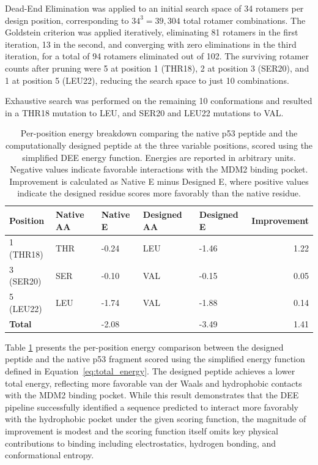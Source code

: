 Dead-End Elimination was applied to an initial search space of 34 rotamers per design position, corresponding to $34^3=39,304$ total rotamer combinations. The Goldstein criterion was applied iteratively, eliminating 81 rotamers in the first iteration, 13 in the second, and converging with zero eliminations in the third iteration, for a total of 94 rotamers eliminated out of 102. The surviving rotamer counts after pruning were 5 at position 1 (THR18), 2 at position 3 (SER20), and 1 at position 5 (LEU22), reducing the search space to just 10 combinations.

Exhaustive search was performed on the remaining 10 conformations and resulted in a THR18 mutation to LEU, and SER20 and LEU22 mutations to VAL.

\begin{table}[h]
\centering
\caption{Per-position energy breakdown comparing the native p53 peptide and the computationally designed peptide at the three variable positions, scored using the simplified DEE energy function. Energies are reported in arbitrary units. Negative values indicate favorable interactions with the MDM2 binding pocket. Improvement is calculated as Native E minus Designed E, where positive values indicate the designed residue scores more favorably than the native residue.}
\begin{tabular}{lllllr}
\hline
\textbf{Position} & \textbf{Native AA} & \textbf{Native E} & \textbf{Designed AA} & \textbf{Designed E} & \textbf{Improvement} \\
\hline
1 (THR18) & THR & -0.24 & LEU & -1.46 & 1.22 \\
3 (SER20) & SER & -0.10 & VAL & -0.15 & 0.05 \\
5 (LEU22) & LEU & -1.74 & VAL & -1.88 & 0.14 \\
\hline
\textbf{Total} & & -2.08 & & -3.49 & 1.41 \\
\hline
\end{tabular}
\label{tab:dee_comparison}
\end{table}

Table \ref{tab:dee_comparison} presents the per-position energy comparison between the designed peptide and the native p53 fragment scored using the simplified energy function defined in Equation~\ref{eq:total_energy}. The designed peptide achieves a lower total energy, reflecting more favorable van der Waals and hydrophobic contacts with the MDM2 binding pocket. While this result demonstrates that the DEE pipeline successfully identified a sequence predicted to interact more favorably with the hydrophobic pocket under the given scoring function, the magnitude of improvement is modest and the scoring function itself omits key physical contributions to binding including electrostatics, hydrogen bonding, and conformational entropy.

